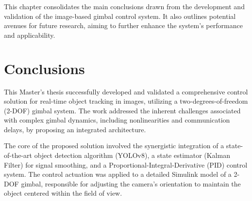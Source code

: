 



This chapter consolidates the main conclusions drawn from the development and validation of the image-based gimbal control system. It also outlines potential avenues for future research, aiming to further enhance the system's performance and applicability.

\section{Conclusions}
This Master's thesis successfully developed and validated a comprehensive control solution for real-time object tracking in images, utilizing a two-degrees-of-freedom (2-DOF) gimbal system. The work addressed the inherent challenges associated with complex gimbal dynamics, including nonlinearities and communication delays, by proposing an integrated architecture.

The core of the proposed solution involved the synergistic integration of a state-of-the-art object detection algorithm (YOLOv8), a state estimator (Kalman Filter) for signal smoothing, and a Proportional-Integral-Derivative (PID) control system. The control actuation was applied to a detailed Simulink model of a 2-DOF gimbal, responsible for adjusting the camera's orientation to maintain the object centered within the field of view.

